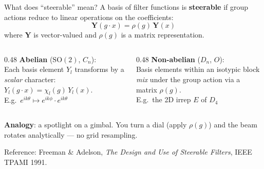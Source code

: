\documentclass[aspectratio=169]{beamer}
\newcommand{\SO}{\mathrm{SO}}
\begin{document}
\begin{frame}{What does ``steerable'' mean?}
  A basis of filter functions is \textbf{steerable} if group actions reduce to linear operations on the coefficients:
  \[
    \mathbf{Y}(g \cdot x) = \rho(g) \, \mathbf{Y}(x)
  \]
  where $\mathbf{Y}$ is vector-valued and $\rho(g)$ is a matrix representation.

  \medskip

  \begin{columns}[T]
    \begin{column}{0.48\textwidth}
      \textbf{Abelian} ($\SO(2)$, $C_n$):\\
      Each basis element $Y_l$ transforms by a \textit{scalar} character: $Y_l(g \cdot x) = \chi_l(g) \, Y_l(x)$.\\
      {\small E.g.\ $e^{ik\theta} \mapsto e^{ik\phi} \cdot e^{ik\theta}$}
    \end{column}
    \begin{column}{0.48\textwidth}
      \textbf{Non-abelian} ($D_n$, $O$):\\
      Basis elements within an isotypic block \textit{mix} under the group action via a matrix $\rho(g)$.\\
      {\small E.g.\ the 2D irrep $E$ of $D_4$}
    \end{column}
  \end{columns}

  \bigskip

  \textbf{Analogy}: a spotlight on a gimbal. You turn a dial (apply $\rho(g)$) and the beam rotates analytically --- no grid resampling.

  \medskip

  {\small Reference: Freeman \& Adelson, \textit{The Design and Use of Steerable Filters}, IEEE TPAMI 1991.}
\end{frame}
\end{document}
